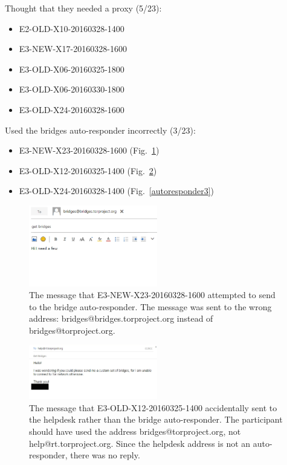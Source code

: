 \documentclass[USenglish,oneside,twocolumn]{article}
\begin{document}
Thought that they needed a proxy (5/23): 
\begin{itemize}
\item E2-OLD-X10-20160328-1400
\item E3-NEW-X17-20160328-1600
\item E3-OLD-X06-20160325-1800
\item E3-OLD-X06-20160330-1800
\item E3-OLD-X24-20160328-1600
\end{itemize} 

Used the bridges auto-responder incorrectly (3/23): 
\begin{itemize}
\item E3-NEW-X23-20160328-1600 (Fig.~\ref{autoresponder1})
\item E3-OLD-X12-20160325-1400 (Fig.~\ref{autoresponder2})
\item E3-OLD-X24-20160328-1400 (Fig.~\ref{autoresponder3})
\end{itemize}   

\begin{figure}[h]
\includegraphics[width=0.5\textwidth]{../experiment/processing/failed-participants/20160325-140813-bridgeresponder-redacted.png}
\caption{The message that E3-NEW-X23-20160328-1600 attempted to send to the bridge auto-responder. The message was sent to the wrong address: bridges@bridges.torproject.org instead of bridges@torproject.org.}
\label{autoresponder1}
\end{figure} 

\begin{figure}[h]
\includegraphics[width=0.5\textwidth]{../experiment/processing/failed-participants/20160328-133857-bridgeresponder-redacted.png}
\caption{The message that E3-OLD-X12-20160325-1400 accidentally sent to the helpdesk rather than the bridge auto-responder. The participant should have used the address bridges@torproject.org, not help@rt.torproject.org. Since the helpdesk address is not an auto-responder, there was no reply.}
\label{autoresponder2}
\end{figure} 
\end{document}
